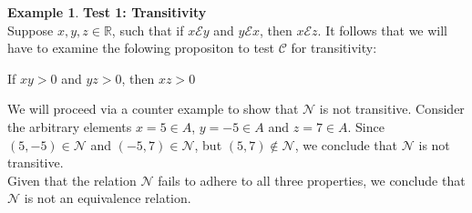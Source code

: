 \documentclass{book}
\theoremstyle{definition}
\newtheorem{example}{Example}[definition]
\theoremstyle{remark}
\newcommand{\bb}[1]{\mathbb{#1}}
\newcommand{\cc}[1]{\mathcal{#1}}
\begin{document}
\begin{example}
            \textbf{Test 1: Transitivity } \\
                 Suppose $x,y,z \in \bb{R}$, such that if $x \cc{E} y$ and $y \cc{E} x$, then $x \cc{E} z$. It follows that we will have to examine the folowing propositon to test $\cc{C}$ for transitivity:
                    \begin{center}
                        If $xy > 0$ and $yz > 0$, then $xz > 0$
                    \end{center}
                
                We will proceed via a counter example to show that $\cc{N}$ is not transitive. Consider the arbitrary elements $x = 5 \in A$, $y = - 5 \in A$ and $z = 7 \in A$. Since $(5,-5) \in \cc{N}$ and $(-5, 7) \in \cc{N}$, but $(5,7) \notin \cc{N}$, we conclude that $\cc{N}$ is not transitive. \\
                 
            Given that the relation $\cc{N}$ fails to adhere to all three properties, we conclude that $\cc{N}$ is not an equivalence relation. \\
    \end{example}
\end{document}
